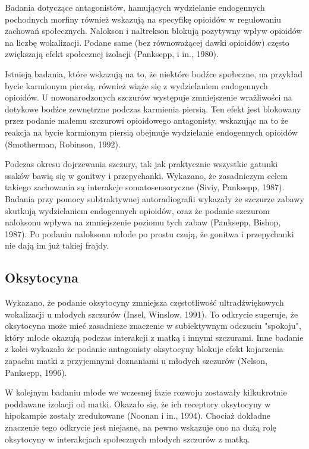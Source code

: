 \documentclass{psychol}
\begin{document}
Badania dotyczące antagonistów, hamujących wydzielanie endogennych pochodnych morfiny również wskazują na specyfikę opioidów w regulowaniu zachowań społecznych. Nalokson i naltrekson blokują pozytywny wpływ opioidów na \colorbox{yellow!30}{liczbę} wokalizacji. Podane same (bez równoważącej dawki opioidów) często zwiększają efekt społecznej izolacji (Panksepp, i in., 1980).

Istnieją badania, które wskazują na to, że niektóre bodźce społeczne, na przykład bycie karmionym piersią, również wiąże się z wydzielaniem endogennych opioidów. U nowonarodzonych szczurów występuje zmniejszenie wrażliwości na dotykowe bodźce zewnętrzne podczas karmienia piersią. Ten efekt jest blokowany przez podanie małemu szczurowi opioidowego antagonisty, wskazując na to że reakcja na bycie karmionym piersią obejmuje wydzielanie endogennych opioidów (Smotherman, Robinson, 1992).

Podczas okresu dojrzewania szczury, tak jak praktycznie wszystkie gatunki ssaków bawią się w gonitwy i przepychanki. Wykazano, że zasadniczym celem takiego zachowania są interakcje somatosensoryczne (Siviy, Panksepp, 1987). Badania przy pomocy subtraktywnej autoradiografii wykazały że szczurze zabawy skutkują wydzielaniem endogennych opioidów, oraz że podanie szczurom naloksonu wpływa na zmniejszenie poziomu tych zabaw (Panksepp, Bishop, 1987).  Po podaniu naloksonu młode po prostu czują, że gonitwa i przepychanki nie dają im już takiej frajdy.

\subsection{Oksytocyna}

Wykazano, że podanie oksytocyny zmniejsza częstotliwość ultradźwiękowych wokalizacji u młodych szczurów (Insel, Winslow, 1991). To odkrycie sugeruje, że oksytocyna może mieć zasadnicze znaczenie w subiektywnym odczuciu "spokoju", który młode okazują podczas interakcji z matką i innymi szczurami. Inne badanie z kolei wykazało że podanie antagonisty oksytocyny blokuje efekt kojarzenia zapachu matki z przyjemnymi doznaniami u młodych szczurów (Nelson, Panksepp, 1996).

W kolejnym badaniu młode we wczesnej fazie rozwoju zostawały kilkukrotnie poddawane izolacji od matki. Okazało się, że ich receptory oksytocyny w hipokampie zostały zredukowane \colorbox{yellow!30}{(Noonan i in., 1994)}. Chociaż dokładne znaczenie tego odkrycie jest niejasne, na pewno wskazuje ono na dużą rolę oksytocyny w interakcjach społecznych młodych szczurów z matką.
\end{document}
